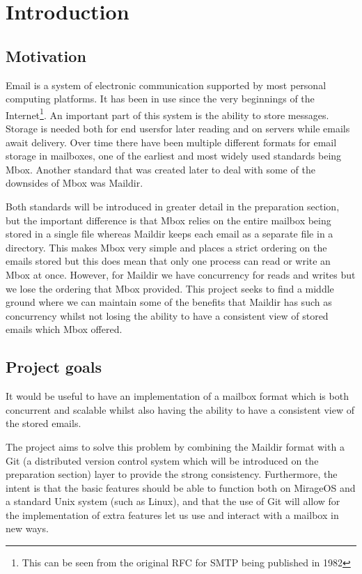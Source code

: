 \chapter{Introduction}

\section{Motivation}

Email is a system of electronic communication supported by most personal computing platforms. It has been in use since the very beginnings of the Internet\footnote{This can be seen from the original RFC for SMTP being published in 1982\cite{rfc821}}. An important part of this system is the ability to store messages. Storage is needed both for end usersfor later reading and on servers while emails await delivery. Over time there have been multiple different formats for email storage in mailboxes, one of the earliest and most widely used standards being Mbox. Another standard that was created later to deal with some of the downsides of Mbox was Maildir.

Both standards will be introduced in greater detail in the preparation section, but the important difference is that Mbox relies on the entire mailbox being stored in a single file whereas Maildir keeps each email as a separate file in a directory. This makes Mbox very simple and places a strict ordering on the emails stored but this does mean that only one process can read or write an Mbox at once. However, for Maildir we have concurrency for reads and writes but we lose the ordering that Mbox provided. This project seeks to find a middle ground where we can maintain some of the benefits that Maildir has such as concurrency whilst not losing the ability to have a consistent view of stored emails which Mbox offered.

\section{Project goals}

It would be useful to have an implementation of a mailbox format which is both concurrent and scalable whilst also having the ability to have a consistent view of the stored emails.

The project aims to solve this problem by combining the Maildir format with a Git (a distributed version control system which will be introduced on the preparation section) layer to provide the strong consistency. Furthermore, the intent is that the basic features should be able to function both on MirageOS and a standard Unix system (such as Linux), and that the use of Git will allow for the implementation of extra features let us use and interact with a mailbox in new ways.

